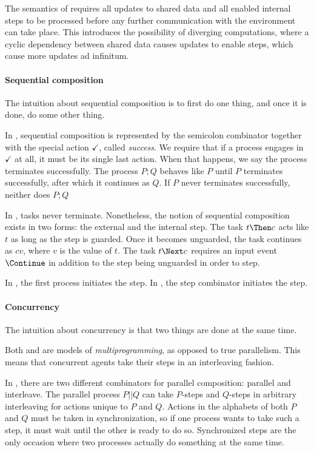 The semantics of \TOP requires all updates to shared data and all enabled internal steps to be processed before any further communication with the environment can take place.
This introduces the possibility of diverging computations, where a cyclic dependency between shared data causes updates to enable steps, which cause more updates ad infinitum.


\paragraph{Sequential composition}

The intuition about sequential composition is to first do one thing, and once it is done, do some other thing.

In \CSP, sequential composition is represented by the semicolon combinator together with the special action $\checkmark$, called \emph{success}.
We require that if a process engages in $\checkmark$ at all, it must be its single last action.
When that happens, we say the process terminates successfully.
The process $P;Q$ behaves like $P$ until $P$ terminates successfully, after which it continues as $Q$.
If $P$ never terminates successfully, neither does $P;Q$

In \TOP, tasks never terminate.
Nonetheless, the notion of sequential composition exists in two forms: the external and the internal step.
The task $t \Then c$ acts like $t$ as long as the step is guarded.
Once it becomes unguarded, the task continues as $cv$, where $v$ is the value of $t$.
The task $t \Next c$ requires an input event $\Continue$ in addition to the step being unguarded in order to step.

In \CSP, the first process initiates the step.
In \TOP, the step combinator initiates the step.


\paragraph{Concurrency}

The intuition about concurrency is that two things are done at the same time.

Both \TOP and \CSP are models of \emph{multiprogramming}, as opposed to true parallelism.
This means that concurrent agents take their steps in an interleaving fashion.

In \CSP, there are two different combinators for parallel composition: parallel and interleave.
The parallel process $P || Q$ can take $P$-steps and $Q$-steps in arbitrary interleaving for actions unique to $P$ and $Q$.
Actions in the alphabets of both $P$ and $Q$ must be taken in synchronization, so if one process wants to take such a step, it must wait until the other is ready to do so.
Synchronized steps are the only occasion where two processes actually do something at the same time.

